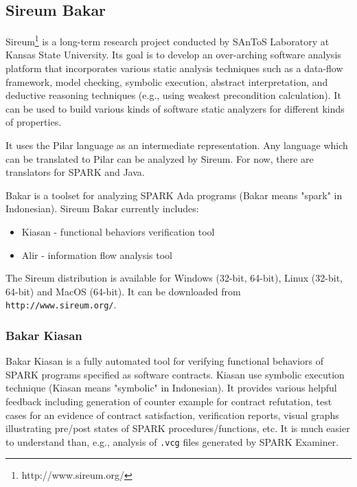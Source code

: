 \subsection{Sireum Bakar}
\label{background:sparkverification:sireum}

Sireum\footnote{http://www.sireum.org/} is a long-term research project conducted by SAnToS Laboratory at Kansas State University. Its goal is to develop an over-arching software analysis platform that incorporates various static analysis techniques such as a data-flow framework, model checking, symbolic execution, abstract interpretation, and deductive reasoning techniques (e.g., using weakest precondition calculation). It can be used to build various kinds of software static analyzers for different kinds of properties. 

It uses the Pilar language \cite{Pilar:Paper} as an intermediate representation. Any language which can be translated to Pilar can be analyzed by Sireum. For now, there are translators for SPARK and Java.

Bakar is a toolset for analyzing SPARK Ada programs (Bakar means "spark" in Indonesian). Sireum Bakar currently includes:
\begin{itemize}
	\item Kiasan - functional behaviors verification tool
	\item Alir - information flow analysis tool	
\end{itemize}

The Sireum distribution is available for Windows (32-bit, 64-bit), Linux (32-bit, 64-bit) and MacOS (64-bit). It can be downloaded from \lstinline{http://www.sireum.org/}.


\subsubsection{Bakar Kiasan}

Bakar Kiasan \cite{Kiasan:Paper} is a fully automated tool for verifying functional behaviors of SPARK programs specified as software contracts. Kiasan use symbolic execution technique (Kiasan means "symbolic" in Indonesian). It provides various helpful feedback including generation of counter example for contract refutation, test cases for an evidence of contract satisfaction, verification reports, visual graphs illustrating pre/post states of SPARK procedures/functions, etc. It is much easier to understand than, e.g., analysis of \lstinline{.vcg} files generated by SPARK Examiner.

